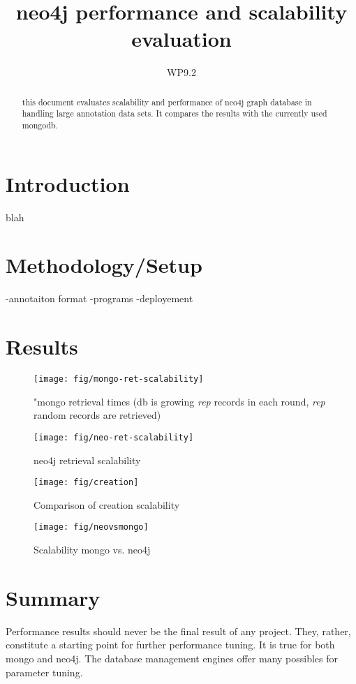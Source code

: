 \documentclass[a4paper,10pt]{article}
\title{neo4j performance and scalability evaluation}
\author{WP9.2}
\begin{document}
\maketitle

\begin{abstract}
this document evaluates scalability and performance of neo4j graph database in handling 
large annotation data sets. It compares the results with the currently used mongodb. 
\end{abstract}

\section{Introduction}
blah

\section{Methodology/Setup}
-annotaiton format
-programs
-deployement

\section{Results}
\begin{figure}
\centering
 \texttt{[image: fig/mongo-ret-scalability]}
 \caption{"mongo retrieval times (db is growing \emph{rep} records in each round, \emph{rep} random records are retrieved)}
\end{figure}

\begin{figure}
\centering
 \texttt{[image: fig/neo-ret-scalability]}
 \caption{neo4j retrieval scalability}
\end{figure}

\begin{figure}
\centering
 \texttt{[image: fig/creation]}
 \caption{Comparison of creation scalability}
\end{figure}

\begin{figure}
\centering
 \texttt{[image: fig/neovsmongo]}
 \caption{Scalability mongo vs. neo4j}
\end{figure}




\section{Summary}
Performance results should never be the final result of any project. They, rather, constitute
a starting point for further performance tuning. It is true for both mongo and neo4j. The database
management engines offer many possibles for parameter tuning. 
\end{document}
